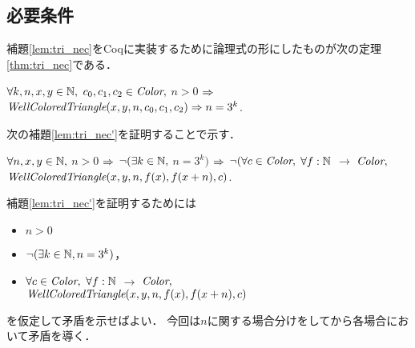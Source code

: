\subsection{必要条件} \label{sec:nec}
補題\ref{lem:tri_nec}をCoqに実装するために論理式の形にしたものが次の定理\ref{thm:tri_nec}である．
\begin{thm}[必要条件] \label{thm:tri_nec}
  $\forall k, n, x, y \in \mathbb{N},$ $c_0, c_1, c_2 \in \textit{Color},$
  $n > 0$ $\Rightarrow$ 
  $\textit{WellColoredTriangle}(x,y,n,c_0,c_1,c_2) \Rightarrow n = 3 ^ k$.
\end{thm}
次の補題\ref{lem:tri_nec'}を証明することで示す．
\begin{lem} \label{lem:tri_nec'}
  $\forall n, x, y \in \mathbb{N},$ $n > 0$ $\Rightarrow$ 
  $\lnot(\exists k \in \mathbb{N},$ $n = 3 ^ k)$ $\Rightarrow$
  $\lnot( \forall c \in \textit{Color},$
  $\forall f:\mathbb{N}$ $\to$ $\textit{Color},$
  $\textit{WellColoredTriangle}(x,y,n,f(x),f(x+n),c)$.
\end{lem}
補題\ref{lem:tri_nec'}を証明するためには
\begin{itemize}
\item
  $n > 0$
\item
  $\lnot(\exists k \in \mathbb{N}, n = 3 ^ k)$，
\item
  $\forall c \in \textit{Color},$ $\forall f:\mathbb{N}$ $\to$ $\textit{Color},$ \\
  $\textit{WellColoredTriangle}(x,y,n,f(x),f(x+n),c)$
\end{itemize}
を仮定して矛盾を示せばよい．
今回は$n$に関する場合分けをしてから各場合において矛盾を導く．
